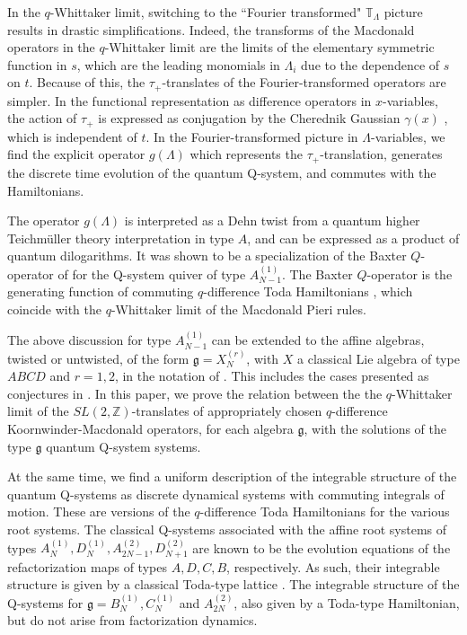 \documentclass[12pt]{amsart}
\newcommand{\g}{{\mathfrak{g}}}
\newcommand{\Z}{{\mathbb Z}}
\numberwithin{equation}{section}
\begin{document}
%
%
In the $q$-Whittaker limit, switching to the ``Fourier transformed" $\mathbb T_\Lambda$ picture results in drastic simplifications.
%
Indeed, the transforms of the Macdonald operators in the $q$-Whittaker limit are the limits of the elementary symmetric function in $s$, which are the leading monomials in 
$\Lambda_i$ due to the dependence of $s$ on $t$. Because of this, 
the $\tau_+$-translates of the Fourier-transformed operators are simpler. 
In the functional representation as difference operators in $x$-variables, the action of $\tau_+$ is expressed as conjugation by the Cherednik Gaussian 
$\gamma(x)$ \cite{Cheredbook}, which is independent of $t$. In the Fourier-transformed picture in $\Lambda$-variables, we find the explicit operator 
$g(\Lambda)$ which represents the $\tau_+$-translation,  generates the discrete time evolution of the quantum Q-system, and commutes with the Hamiltonians. 

The operator $g(\Lambda)$ is interpreted as a Dehn twist \cite{SS} from a quantum higher Teichmüller theory interpretation in type $A$, 
and can be expressed as a product of quantum dilogarithms. It was shown to be a specialization of the Baxter $Q$-operator of \cite{SS} for the Q-system quiver of type $A_{N-1}^{(1)}$. 
The Baxter $Q$-operator is the generating function of commuting $q$-difference Toda Hamiltonians \cite{Etingof}, which coincide with the $q$-Whittaker limit of the Macdonald Pieri rules.

The above discussion for type $A_{N-1}^{(1)}$ can be extended to the affine algebras, twisted or untwisted, of the form $\g=X_N^{(r)}$, with $X$ a classical Lie algebra of type $ABCD$ and $r=1,2$, in the notation of \cite{Kac,HKOTT}. This includes the cases  presented as
conjectures in \cite{DFKconj}.  In this paper, we prove the relation between the the $q$-Whittaker limit of the $SL(2,\Z)$-translates of appropriately chosen $q$-difference Koornwinder-Macdonald operators, for each algebra $\g$,  with the solutions of the type $\g$ quantum Q-system systems.
%
%
%
%
%
%

At the same time, we find a uniform description of the integrable structure of the quantum Q-systems as discrete dynamical systems with commuting integrals of motion. These are versions of the $q$-difference Toda Hamiltonians for the various root systems.
The classical Q-systems associated with the affine root systems of types $A^{(1)}_N, D^{(1)}_N, A^{(2)}_{2N-1},  D^{(2)}_{N+1}$
are known \cite{Williams} to be the evolution equations of the refactorization maps 
of types $A,D,C,B$, respectively. 
As such, their integrable structure is given by a classical Toda-type lattice \cite{HKKR,Resh03}.
The integrable structure of the Q-systems for $\g=B_N^{(1)},C_N^{(1)}$ and $A^{(2)}_{2N}$, also given by a Toda-type Hamiltonian, but do not arise from factorization dynamics.
\end{document}
